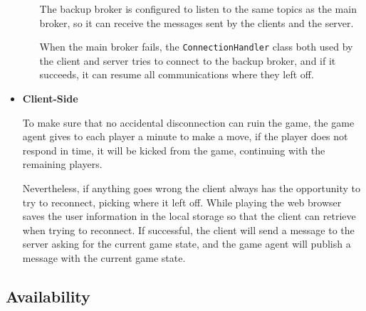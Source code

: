 \documentclass{scrartcl}
\begin{document}
\begin{itemize}
\begin{itemize}
                        The backup broker is configured to listen to the same topics as the
                        main broker, so it can receive the messages sent by the clients and the server.

                        When the main broker fails, the \texttt{ConnectionHandler} class both used
                        by the client and server tries to connect to the backup broker,
                        and if it succeeds, it can resume all communications where they left off.
            \end{itemize}
      \item
            \textbf{Client-Side} \par
            To make sure that no accidental disconnection can ruin the game, the game agent gives to
            each player a minute to make a move, if the player does not respond in time, it will be
            kicked from the game, continuing with the remaining players.

            Nevertheless, if anything goes wrong the client always has the opportunity to try to
            reconnect, picking where it left off. While playing the web browser saves the user
            information in the local storage so that the client can retrieve when trying to reconnect.
            If successful, the client will send a message to the server asking for the current game
            state, and the game agent will publish a message with the current game state.
\end{itemize}

\subsection{Availability}\label{availability}


\end{document}
